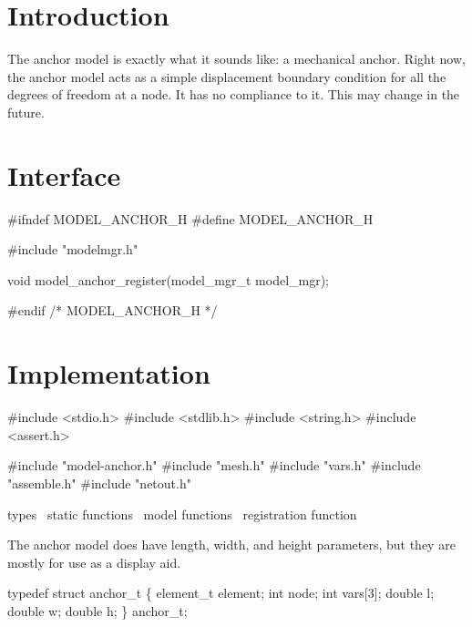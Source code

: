 
\section{Introduction}

The anchor model is exactly what it sounds like: a mechanical anchor.
Right now, the anchor model acts as a simple displacement boundary
condition for all the degrees of freedom at a node.  It has no compliance
to it.  This may change in the future.


\section{Interface}

\endmoddef
#ifndef MODEL_ANCHOR_H
#define MODEL_ANCHOR_H

#include "modelmgr.h"

void model_anchor_register(model_mgr_t model_mgr);

#endif /* MODEL_ANCHOR_H */
\nwendcode{}\nwdocspar


\section{Implementation}

\nwenddocs{}\endmoddef
#include <stdio.h>
#include <stdlib.h>
#include <string.h>
#include <assert.h>

#include "model-anchor.h"
#include "mesh.h"
#include "vars.h"
#include "assemble.h"
#include "netout.h"

\LA{}types~{\nwtagstyle{}}\RA{}
\LA{}static functions~{\nwtagstyle{}}\RA{}
\LA{}model functions~{\nwtagstyle{}}\RA{}
\LA{}registration function~{\nwtagstyle{}}\RA{}
\nwendcode{}\nwdocspar


The anchor model does have length, width, and height parameters, but they
are mostly for use as a display aid.

\nwenddocs{}\endmoddef
typedef struct anchor_t \{
    element_t element;
    int node;
    int vars[3];
    double l;
    double w;
    double h;
\} anchor_t;

